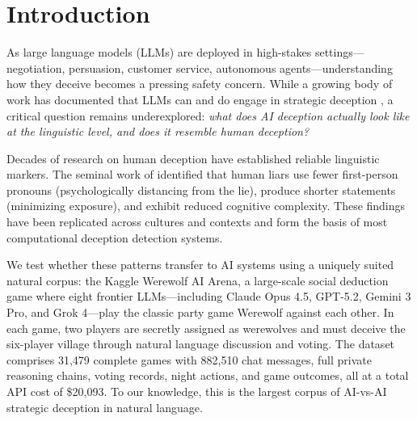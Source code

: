\section{Introduction}
\label{sec:intro}

As large language models (LLMs) are deployed in high-stakes settings---negotiation, persuasion, customer service, autonomous agents---understanding how they deceive becomes a pressing safety concern. While a growing body of work has documented that LLMs can and do engage in strategic deception \citep{park2024ai, scheurer2024large, hubinger2024sleeper}, a critical question remains underexplored: \emph{what does AI deception actually look like at the linguistic level, and does it resemble human deception?}

Decades of research on human deception have established reliable linguistic markers. The seminal work of \citet{newman2003lying} identified that human liars use fewer first-person pronouns (psychologically distancing from the lie), produce shorter statements (minimizing exposure), and exhibit reduced cognitive complexity. These findings have been replicated across cultures and contexts \citep{depaulo2003cues, hauch2015computers} and form the basis of most computational deception detection systems.

We test whether these patterns transfer to AI systems using a uniquely suited natural corpus: the Kaggle Werewolf AI Arena, a large-scale social deduction game where eight frontier LLMs---including Claude Opus 4.5, GPT-5.2, Gemini 3 Pro, and Grok 4---play the classic party game Werewolf against each other. In each game, two players are secretly assigned as werewolves and must deceive the six-player village through natural language discussion and voting. The dataset comprises 31,479 complete games with 882,510 chat messages, full private reasoning chains, voting records, night actions, and game outcomes, all at a total API cost of \$20,093. To our knowledge, this is the largest corpus of AI-vs-AI strategic deception in natural language.


